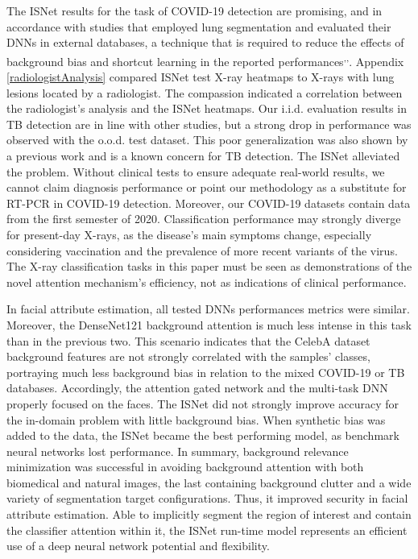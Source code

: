 \documentclass[fleqn,10pt]{wlscirep}
\begin{document}
{The ISNet results for the task of COVID-19 detection are promising, and in accordance with studies that employed lung segmentation and evaluated their DNNs in external databases, a technique that is required to reduce the effects of background bias and shortcut learning in the reported performances\cite{ShortcutCovid}\textsuperscript{,}\cite{bassi2021covid19}\textsuperscript{,}\cite{NatureCovidBias}.  Appendix \ref{radiologistAnalysis} compared ISNet test X-ray heatmaps to X-rays with lung lesions located by a radiologist. The compassion indicated a correlation between the radiologist's analysis and the ISNet heatmaps. Our i.i.d. evaluation results in TB detection are in line with other studies\cite{TBReview}, but a strong drop in performance was observed with the o.o.d. test dataset. This poor generalization was also shown by a previous work\cite{TBBadGeneralization} and is a known concern for TB detection\cite{who}. The ISNet alleviated the problem. Without clinical tests to ensure adequate real-world results, we cannot claim diagnosis performance or point our methodology as a substitute for RT-PCR in COVID-19 detection. Moreover, our COVID-19 datasets contain data from the first semester of 2020. Classification performance may strongly diverge for present-day X-rays, as the disease's main symptoms change, especially considering vaccination and the prevalence of more recent variants of the virus. The X-ray classification tasks in this paper must be seen as demonstrations of the novel attention mechanism's efficiency, not as indications of clinical performance.

In facial attribute estimation, all tested DNNs performances metrics were similar. Moreover, the DenseNet121 background attention is much less intense in this task than in the previous two. This scenario indicates that the CelebA dataset background features are not strongly correlated with the samples' classes, portraying much less background bias in relation to the mixed COVID-19 or TB databases. Accordingly, the attention gated network and the multi-task DNN properly focused on the faces. The ISNet did not strongly improve accuracy for the in-domain problem with little background bias. When synthetic bias was added to the data, the ISNet became the best performing model, as benchmark neural networks lost performance. In summary, background relevance minimization was successful in avoiding background attention with both biomedical and natural images, the last containing background clutter and a wide variety of segmentation target configurations. Thus, it improved security in facial attribute estimation. Able to implicitly segment the region of interest and contain the classifier attention within it, the ISNet run-time model represents an efficient use of a deep neural network potential and flexibility.

}
\end{document}
